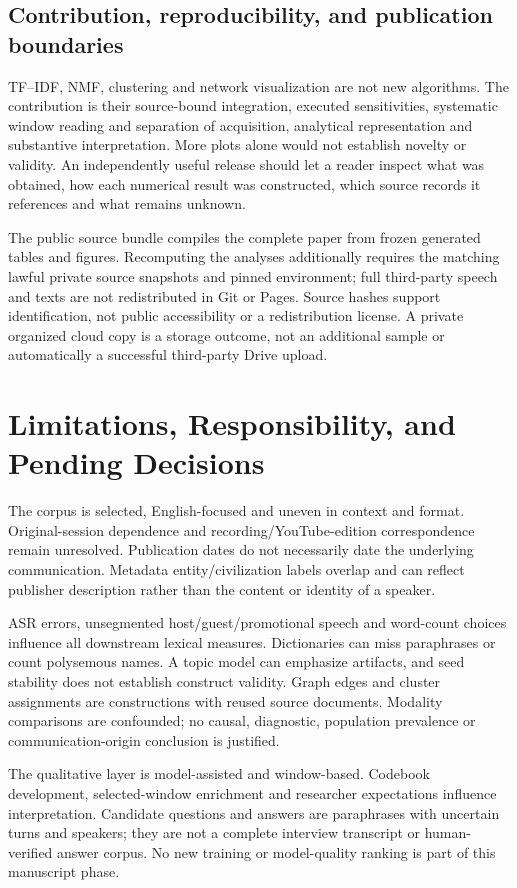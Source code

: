 \subsection{Contribution, reproducibility, and publication boundaries}
TF--IDF, NMF, clustering and network visualization are not new algorithms. The contribution is their source-bound integration, executed sensitivities, systematic window reading and separation of acquisition, analytical representation and substantive interpretation. More plots alone would not establish novelty or validity. An independently useful release should let a reader inspect what was obtained, how each numerical result was constructed, which source records it references and what remains unknown.

The public source bundle compiles the complete paper from frozen generated tables and figures. Recomputing the analyses additionally requires the matching lawful private source snapshots and pinned environment; full third-party speech and texts are not redistributed in Git or Pages. Source hashes support identification, not public accessibility or a redistribution license. A private organized cloud copy is a storage outcome, not an additional sample or automatically a successful third-party Drive upload.

\section{Limitations, Responsibility, and Pending Decisions}
The corpus is selected, English-focused and uneven in context and format. Original-session dependence and recording/YouTube-edition correspondence remain unresolved. Publication dates do not necessarily date the underlying communication. Metadata entity/civilization labels overlap and can reflect publisher description rather than the content or identity of a speaker.

ASR errors, unsegmented host/guest/promotional speech and word-count choices influence all downstream lexical measures. Dictionaries can miss paraphrases or count polysemous names. A topic model can emphasize artifacts, and seed stability does not establish construct validity. Graph edges and cluster assignments are constructions with reused source documents. Modality comparisons are confounded; no causal, diagnostic, population prevalence or communication-origin conclusion is justified.

The qualitative layer is model-assisted and window-based. Codebook development, selected-window enrichment and researcher expectations influence interpretation. Candidate questions and answers are paraphrases with uncertain turns and speakers; they are not a complete interview transcript or human-verified answer corpus. No new training or model-quality ranking is part of this manuscript phase.

